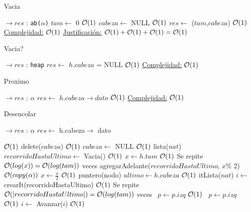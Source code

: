 \newpage
\begin{Algoritmos}

\begin{algorithm}
\caption{Vacia}
\begin{algorithmic}[1]
   $\to res$ : \texttt{ab($\alpha$)}
  \State $tam \gets$ 0 \Comment $\mathcal{O}(1)$
  \State $cabeza \gets$ NULL \Comment $\mathcal{O}(1)$
  \State $res \gets$ ($tam$,$cabeza$) \Comment $\mathcal{O}(1)$
 \EndProcedure
 \underline{Complejidad:} $\mathcal{O}(1)$
 \underline{Justificación:} $\mathcal{O}(1)+\mathcal{O}(1)+\mathcal{O}(1) = \mathcal{O}(1)$
\end{algorithmic}
\end{algorithm}


\begin{algorithm}
\caption{Vacia?}
\begin{algorithmic}[1]
   $\to res$ : \texttt{heap}
  \State $res \gets$ $h.cabeza$ = NULL \Comment $\mathcal{O}(1)$ 
 \EndProcedure
 \underline{Complejidad:} $\mathcal{O}(1)$
\end{algorithmic}
\end{algorithm}


\begin{algorithm}
\caption{Proximo}
\begin{algorithmic}[1]
   $\to res$ : $\alpha$
  \State $res \gets$ $h.cabeza \to dato$ \Comment $\mathcal{O}(1)$ 
 \EndProcedure
 \underline{Complejidad:} $\mathcal{O}(1)$
\end{algorithmic}
\end{algorithm}



\begin{algorithm}
\caption{Desencolar}
\begin{algorithmic}[1]
   $\to res$ : $\alpha$
  \State $res \gets$ h.cabeza$\to$ dato

   \Comment $\mathcal{O}(1)$
    \State delete($cabeza$) \Comment $\mathcal{O}(1)$
    \State $cabeza \gets$ NULL \Comment $\mathcal{O}(1)$
  \Else
    \State lista($nat$) $recorridoHastaUltimo \gets$ Vacia() \Comment $\mathcal{O}(1)$
    \State $x \gets h.tam$ \Comment $\mathcal{O}(1)$
     \Comment Se repite $\mathcal{O}(log(x)) = \mathcal{O}(log(tam))$ veces
      \State agregarAdelante($recorridoHastaUltimo$, $x$\% 2) \Comment $\mathcal{O}(copy(\alpha))$
      \State $x \gets \frac{x}{2}$ \Comment $\mathcal{O}(1)$
    \EndWhile
    \State puntero(nodo) $ultimo \gets h.cabeza$ \Comment $\mathcal{O}(1)$
    \State itLista($nat$) $i \gets$ crearIt(recorridoHastaUltimo) \Comment $\mathcal{O}(1)$
      \Comment Se repite $\mathcal{O}(|recorridoHastaUltimo|) = \mathcal{O}(log(tam))$ veces
       \ $p \gets p.izq$ \Comment $\mathcal{O}(1)$
      \Else \  $p \gets p.izq$ \Comment $\mathcal{O}(1)$
      \EndIf
      \State $i \gets$ Avanzar($i$) \Comment $\mathcal{O}(1)$
    \EndWhile
    

\end{algorithmic}
\end{algorithm}
\end{Algoritmos}
